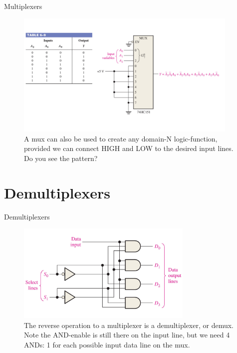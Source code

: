 \documentclass{beamer}
\begin{document}
\begin{frame}{Multiplexers}
\begin{figure}
\centering
\includegraphics[width=0.95\textwidth,trim=2cm 2cm 0cm 2cm,clip=true]{figures/mux8.pdf}
\caption{\label{fig:mux8} A mux can also be used to create any domain-N logic-function, provided we can connect HIGH and LOW to the desired input lines.  Do you see the pattern?}
\end{figure}
\end{frame}

\section{Demultiplexers}

\begin{frame}{Demultiplexers}
\begin{figure}
\centering
\includegraphics[width=0.75\textwidth,trim=3cm 0cm 3cm 0cm,clip=true]{figures/dmux1.pdf}
\caption{\label{fig:dmux1} The reverse operation to a multiplexer is a demultiplexer, or demux.  Note the AND-enable is still there on the input line, but we need 4 ANDs: 1 for each possible input data line on the mux.}
\end{figure}
\end{frame}
\end{document}
